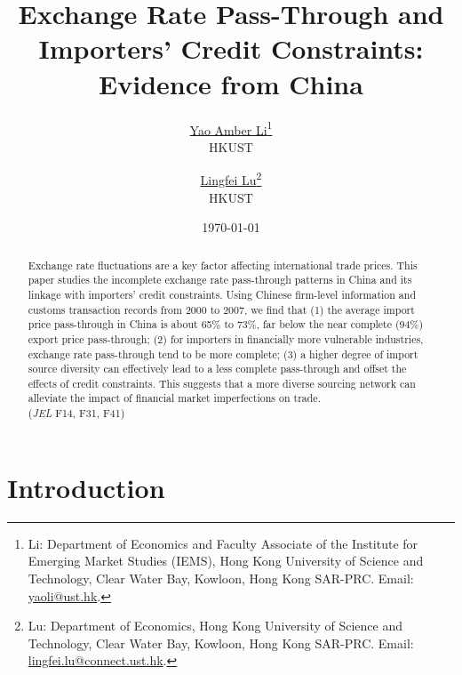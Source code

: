 \documentclass[12pt]{article}
\begin{document}
\title{  \Large \textbf{Exchange Rate Pass-Through and Importers' Credit Constraints: Evidence from China}}

\author{\large \href{http://yaoli.people.ust.hk/}{Yao Amber Li}\thanks{Li: Department of Economics and Faculty Associate of the Institute for Emerging Market Studies (IEMS), Hong Kong University of Science and Technology, Clear Water Bay, Kowloon, Hong Kong SAR-PRC. Email: \href{mailto:yaoli@ust.hk}{yaoli@ust.hk}.}\\ \large{HKUST}
\and \large \href{}{Lingfei Lu}\thanks{Lu: Department of Economics, Hong Kong University of Science and Technology, Clear Water Bay, Kowloon, Hong Kong SAR-PRC. Email: \href{mailto:}{lingfei.lu@connect.ust.hk}.} \\ \large{HKUST}
 }

\date{\today }

\maketitle

\begin{abstract}
Exchange rate fluctuations are a key factor affecting international trade prices. This paper studies the incomplete exchange rate pass-through patterns in China and its linkage with importers' credit constraints. Using Chinese firm-level information and customs transaction records from 2000 to 2007, we find that (1) the average import price pass-through in China is about 65\% to 73\%, far below the near complete (94\%) export price pass-through; (2) for importers in financially more vulnerable industries, exchange rate pass-through tend to be more complete; (3) a higher degree of import source diversity can effectively lead to a less complete pass-through and offset the effects of credit constraints. This suggests that a more diverse sourcing network can alleviate the impact of financial market imperfections on trade.\\
(\textit{JEL} F14, F31, F41)

\end{abstract}

\section{Introduction} \label{Introduction}
\end{document}
